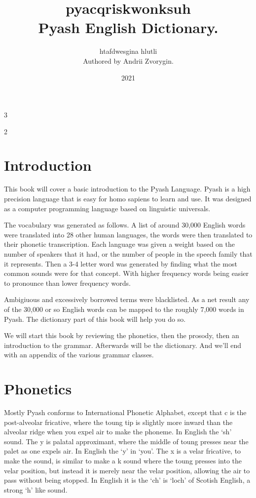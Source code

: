\documentclass[10pt,pagesize]{article}
\title{pyacqriskwonksuh \\ Pyash English Dictionary.}
\author{htafdwesgina hlutli \\ Authored by Andrii Zvorygin.}
\date{2021}
\begin{document}
\maketitle
\begin{multicols}{3}
\scriptsize
\tableofcontents
\end{multicols}
\begin{multicols}{2}
\scriptsize
\section{Introduction}
This book will cover a basic introduction to the Pyash Language. Pyash is a high
precision language that is easy for homo sapiens to learn and use. 
It was designed as a computer programming language based on linguistic 
  universals.

The vocabulary was generated as follows. A list of around 30,000 English words
were translated into 28 other human languages, the words were then translated to
their phonetic transcription. Each language was given a weight based on the
  number of speakers that it had, or the number of people in the  speech family 
  that it represents.   Then a 3-4 letter word was generated by finding what the most common sounds
  were for that concept. With higher frequency words being easier to pronounce
  than lower frequency words. 

Ambigiuous and excessively borrowed terms were
  blacklisted.  As a net result any of the 30,000 or so English words
  can be mapped to the roughly 7,000 words in Pyash. The dictionary part of this
  book will help you do so.

We will start this book by reviewing the phonetics, then the prosody, then an
  introduction to the grammar. Afterwards will be the dictionary. And we'll end with an
  appendix of the various grammar classes. 


\section{Phonetics}
Mostly Pyash conforms to International Phonetic Alphabet,
except that c is the post-alveolar fricative, where the toung tip is slightly
  more inward than the alveolar ridge when you expel air to make the phoneme.
  In English the `sh' sound. 
The y is palatal approximant, where the middle of toung presses near the palet
  as one expels air. In English the `y' in `you'. The x is a velar fricative, to
  make the sound, is similar to make a k sound where the toung presses into the
  velar position, but instead it is merely near the velar position, allowing the
  air to pass without being stopped. In English
  it is the `ch' is `loch' of Scotish English, a strong `h' like sound. 


\end{multicols}
\end{document}

